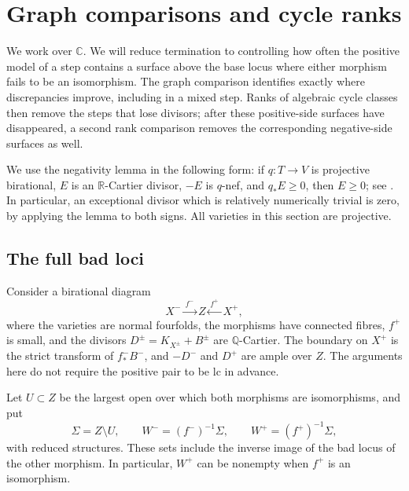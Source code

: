 \section{Graph comparisons and cycle ranks}
\label{sec:comparisons}

We work over $\mathbb C$.  We will reduce termination to controlling how
often the positive model of a step contains a surface above the base
locus where either morphism fails to be an isomorphism.  The graph
comparison identifies exactly where discrepancies improve, including
in a mixed step.  Ranks of algebraic cycle classes then remove the
steps that lose divisors; after these positive-side surfaces have
disappeared, a second rank comparison removes the corresponding
negative-side surfaces as well.

We use the negativity lemma in the following form: if $q:T\to V$ is
projective birational, $E$ is an $\mathbb R$-Cartier divisor, $-E$ is
$q$-nef, and $q_*E\geq0$, then $E\geq0$; see
\cite[Lemma~3.39]{KM98}.  In particular, an exceptional divisor which
is relatively numerically trivial is zero, by applying the lemma to
both signs.  All varieties in this section are projective.

\subsection{The full bad loci}

Consider a birational diagram
\begin{equation}\label{eq:step-diagram}
 X^-\xrightarrow{\,f^-\,} Z
 \xleftarrow{\,f^+\,}X^+,
\end{equation}
where the varieties are normal fourfolds, the morphisms have connected fibres, $f^+$ is small, and the divisors
$D^\pm=K_{X^\pm}+B^\pm$ are $\mathbb Q$-Cartier. The boundary on $X^+$ is the strict transform of $f^-_*B^-$, and
$-D^-$ and $D^+$ are ample over $Z$. The arguments here do not require the positive pair to be lc in advance.

Let $U\subset Z$ be the largest open over which both morphisms are isomorphisms, and put
\begin{equation}\label{eq:bad-loci}
 \Sigma=Z\setminus U,\qquad
 W^-=(f^-)^{-1}\Sigma,\qquad W^+=(f^+)^{-1}\Sigma,
\end{equation}
with reduced structures. These sets include the inverse image of the bad locus of the other morphism. In particular, $W^+$ can be nonempty when $f^+$ is an isomorphism.

